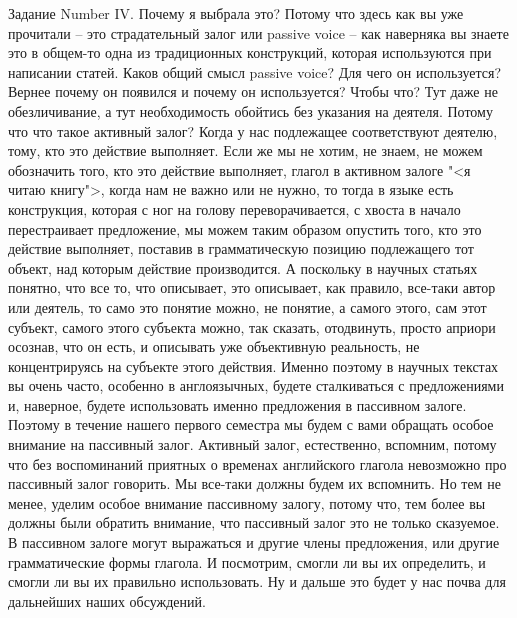 \documentclass[main.tex]{subfiles}
\begin{document}
Задание Number IV. Почему я выбрала это? Потому что здесь как вы уже прочитали -- это страдательный залог или passive voice -- как наверняка вы знаете это в общем-то одна из традиционных конструкций, которая используются при написании статей.
Каков общий смысл passive voice?
Для чего он используется?
Вернее почему он появился и почему он используется?
Чтобы что?
Тут даже не обезличивание, а тут необходимость обойтись без указания на деятеля.
Потому что что такое активный залог? Когда у нас подлежащее соответствуют деятелю, тому, кто это действие выполняет.
Если же мы не хотим, не знаем, не можем обозначить того, кто это действие выполняет, глагол в активном залоге "<я читаю книгу">, когда нам не важно или не нужно, то тогда в языке есть конструкция, которая с ног на голову переворачивается, с хвоста в начало перестраивает предложение, мы можем таким образом опустить того, кто это действие выполняет, поставив в грамматическую позицию подлежащего тот объект, над которым действие производится.
А поскольку в научных статьях понятно, что все то, что описывает, это описывает, как правило, все-таки автор или деятель, то само это понятие можно, не понятие, а самого этого, сам этот субъект, самого этого субъекта можно, так сказать, отодвинуть, просто априори осознав, что он есть, и описывать уже объективную реальность, не концентрируясь на субъекте этого действия.
Именно поэтому в научных текстах вы очень часто, особенно в англоязычных, будете сталкиваться с предложениями и, наверное, будете использовать именно предложения в пассивном залоге.
Поэтому в течение нашего первого семестра мы будем с вами обращать особое внимание на пассивный залог.
Активный залог, естественно, вспомним, потому что без воспоминаний приятных о временах английского глагола невозможно про пассивный залог говорить.
Мы все-таки должны будем их вспомнить.
Но тем не менее, уделим особое внимание пассивному залогу, потому что, тем более вы должны были обратить внимание, что пассивный залог это не только сказуемое.
В пассивном залоге могут выражаться и другие члены предложения, или другие грамматические формы глагола.
И посмотрим, смогли ли вы их определить, и смогли ли вы их правильно использовать.
Ну и дальше это будет у нас почва для дальнейших наших обсуждений.
\end{document}
